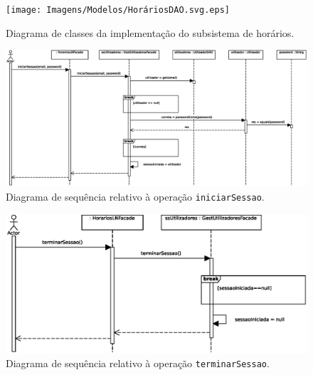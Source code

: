 \documentclass[12pt, a4paper]{article}
\begin{document}
\begin{landscape}
        \vspace*{\fill}
        \pagebreak
        \vspace*{\fill}

        \begin{figure}[H]
            \centering
            \texttt{[image: Imagens/Modelos/HoráriosDAO.svg.eps]}
            \caption{
                Diagrama de classes da implementação do subsistema de horários.
            }
        \end{figure}

        \vspace*{\fill}
        \pagebreak
        \vspace*{\fill}

        \begin{figure}[H]
            \centering
            \includegraphics[scale=0.8]{Imagens/Modelos/iniciarSessaoDAO.svg.eps}
            \caption{
                Diagrama de sequência relativo à operação \texttt{iniciarSessao}.
            }
        \end{figure}

        \vspace*{\fill}
        \pagebreak
        \vspace*{\fill}

        \begin{figure}[H]
            \centering
            \includegraphics[width=\textwidth]{Imagens/Modelos/terminarSessaoDAO.svg.eps}
            \caption{
                Diagrama de sequência relativo à operação \texttt{terminarSessao}.
            }
        \end{figure}


\end{landscape}
\end{document}
